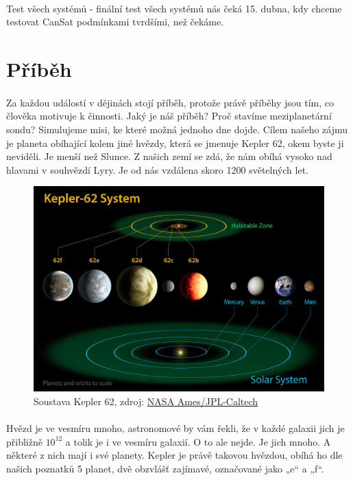 \documentclass[a4paper]{report}
\begin{document}
\paragraph{} Test všech systémů - finální test všech systémů nás čeká 15. dubna, kdy chceme testovat CanSat podmínkami tvrdšími, než čekáme.
\section{Příběh}
\paragraph{} Za každou událostí v dějinách stojí příběh, protože právě příběhy jsou tím, co člověka motivuje k činnosti. Jaký je náš příběh? Proč stavíme meziplanetární sondu? Simulujeme misi, ke které možná jednoho dne dojde. Cílem našeho zájmu je planeta obíhající kolem jiné hvězdy, která se jmenuje Kepler 62, okem byste ji neviděli. Je menší než Slunce. Z našich zemí se zdá, že nám obíhá vysoko nad hlavami v souhvězdí Lyry. Je od nás vzdálena skoro 1200 světelných let.
\begin{figure}[!h]
\centering
\caption{Soustava Kepler 62, zdroj:
\href{https://www.nasa.gov/mission_pages/kepler/multimedia/images/kepler-69-diagram.html}{NASA Ames/JPL-Caltech}}
\includegraphics[width=400pt]{Kepler62.jpg}
\end{figure}
\paragraph{} Hvězd je ve vesmíru mnoho, astronomové by vám řekli, že v každé galaxii jich je přibližně \(10^{12}\) a tolik je i ve vesmíru galaxií. O to ale nejde. Je jich mnoho. A některé z nich mají i své planety. Kepler je právě takovou hvězdou, obíhá ho dle našich poznatků 5 planet, dvě obzvlášť zajímavé, označované jako „e“ a „f“. 
\end{document}
